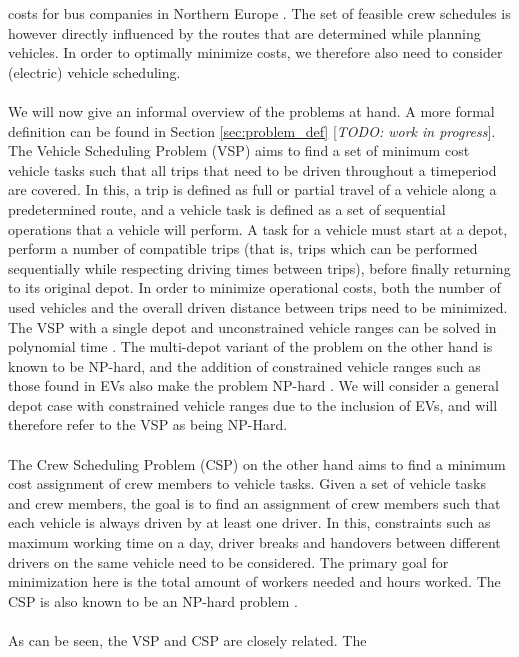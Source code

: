 \documentclass[]{article}
\newcommand{\todo}[1]{{\color{red}[\textit{TODO: #1}]}}
\begin{document}
costs for bus companies in Northern Europe \cite{Perumal2019Crew}. The set of
feasible crew schedules is however directly influenced by the routes that are
determined while planning vehicles. In order to optimally minimize costs, we therefore also need to consider (electric) vehicle scheduling. 
\\\\ We will now give an informal overview of the
problems at hand. A more formal definition can be found in Section
\ref{sec:problem_def} \todo{work in progress}. \\
The Vehicle Scheduling Problem (VSP) aims to find a set
of minimum cost vehicle tasks such that all trips that need to be driven
throughout a timeperiod are covered. In this, a trip is defined as full or
partial travel of a vehicle along a predetermined route, and a vehicle task is
defined as a set of sequential operations that a vehicle will perform. A task for a
vehicle must start at a depot, perform a number of compatible trips (that is,
trips which can be performed sequentially while respecting driving times
between trips), before finally returning to its original depot. In order to
minimize operational costs, both the number of used vehicles and the overall driven
distance between trips need to be minimized. \\ The VSP
with a single depot and unconstrained vehicle ranges can be solved in
polynomial time \cite{Freling2003SDVSP}. The multi-depot variant of the problem
on the other hand is known to be NP-hard, and the addition of constrained vehicle ranges such as those found
in EVs also make the problem NP-hard \cite{Bodin1983}. We will consider a
general depot case with constrained vehicle ranges due to the inclusion of EVs,
and will therefore refer to the VSP as being NP-Hard. \\\\ The Crew
Scheduling Problem (CSP) on the other hand aims to find a minimum cost
assignment of crew members to vehicle tasks. Given a set of vehicle tasks and
crew members, the goal is to find an assignment of crew members such that each
vehicle is always driven by at least one driver. In this, constraints such as
maximum working time on a day, driver breaks and handovers between different
drivers on the same vehicle need to be considered. The primary goal for
minimization here is the total amount of workers needed and hours worked. The
CSP is also known to be an NP-hard problem \cite{Fischetti1989}.\\\\ As can be seen, the VSP and CSP are closely related. The
\end{document}
